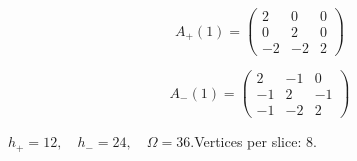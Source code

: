 \begin{minipage}{\linewidth}
\begin{minipage}[c]{0.495\linewidth}
\[A_{+}(1)=\begin{pmatrix}2 & 0 & 0\\0 & 2 & 0\\-2 & -2 & 2\end{pmatrix}\]
\end{minipage}%
\begin{minipage}[c]{0.495\linewidth}\centering\fontsize{10.5}{13}\selectfont
\setlength{\abovedisplayskip}{3pt}\setlength{\belowdisplayskip}{3pt}
\setlength{\abovedisplayshortskip}{3pt}\setlength{\belowdisplayshortskip}{3pt}
\setlength{\arraycolsep}{3.5pt}\renewcommand{\arraystretch}{1.18}
\[A_{-}(1)=\begin{pmatrix}2 & -1 & 0\\-1 & 2 & -1\\-1 & -2 & 2\end{pmatrix}\]
\end{minipage}%
\par\smallskip\noindent\small $h_+=12,\quad h_-=24,\quad \Omega=36.$\quad Vertices per slice: 8.
\end{minipage}\par\vfill
